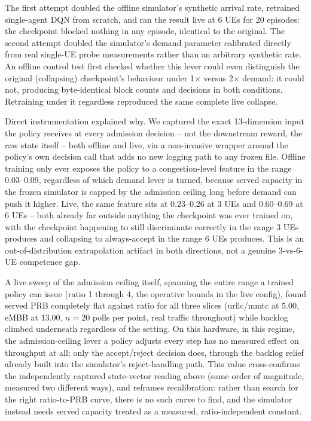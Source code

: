 \documentclass[pdflatex,sn-basic,Numbered]{sn-jnl}%
\begin{document}
The first attempt doubled the offline simulator's synthetic arrival rate, retrained single-agent DQN from scratch, and ran the result live at 6 UEs for 20 episodes: the checkpoint blocked nothing in any episode, identical to the original. The second attempt doubled the simulator's demand parameter calibrated directly from real single-UE probe measurements rather than an arbitrary synthetic rate. An offline control test first checked whether this lever could even distinguish the original (collapsing) checkpoint's behaviour under 1$\times$ versus 2$\times$ demand: it could not, producing byte-identical block counts and decisions in both conditions. Retraining under it regardless reproduced the same complete live collapse.

Direct instrumentation explained why. We captured the exact 13-dimension input the policy receives at every admission decision -- not the downstream reward, the raw state itself -- both offline and live, via a non-invasive wrapper around the policy's own decision call that adds no new logging path to any frozen file. Offline training only ever exposes the policy to a congestion-level feature in the range 0.03--0.09, regardless of which demand lever is turned, because served capacity in the frozen simulator is capped by the admission ceiling long before demand can push it higher. Live, the same feature sits at 0.23--0.26 at 3 UEs and 0.60--0.69 at 6 UEs -- both already far outside anything the checkpoint was ever trained on, with the checkpoint happening to still discriminate correctly in the range 3 UEs produces and collapsing to always-accept in the range 6 UEs produces. This is an out-of-distribution extrapolation artifact in both directions, not a genuine 3-vs-6-UE competence gap.

A live sweep of the admission ceiling itself, spanning the entire range a trained policy can issue (ratio 1 through 4, the operative bounds in the live config), found served PRB completely flat against ratio for all three slices (urllc/mmtc at 5.00, eMBB at 13.00, $n=20$ polls per point, real traffic throughout) while backlog climbed underneath regardless of the setting. On this hardware, in this regime, the admission-ceiling lever a policy adjusts every step has no measured effect on throughput at all; only the accept/reject decision does, through the backlog relief already built into the simulator's reject-handling path. This value cross-confirms the independently captured state-vector reading above (same order of magnitude, measured two different ways), and reframes recalibration: rather than search for the right ratio-to-PRB curve, there is no such curve to find, and the simulator instead needs served capacity treated as a measured, ratio-independent constant.
\end{document}

